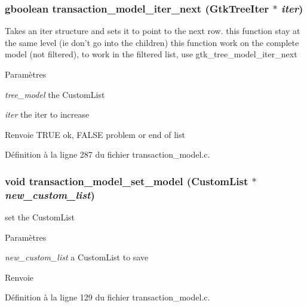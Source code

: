 \subsubsection[{transaction\_\-model\_\-iter\_\-next}]{\setlength{\rightskip}{0pt plus 5cm}gboolean transaction\_\-model\_\-iter\_\-next (GtkTreeIter $\ast$ {\em iter})}\label{transaction__model_8c_a2fd3b631729b3a7c5fd463d06f511b7b}
Takes an iter structure and sets it to point to the next row. this function stay at the same level (ie don't go into the children) this function work on the complete model (not filtered), to work in the filtered list, use gtk\_\-tree\_\-model\_\-iter\_\-next


\begin{DoxyParams}{Paramètres}
\item[{\em tree\_\-model}]the CustomList \item[{\em iter}]the iter to increase\end{DoxyParams}
\begin{DoxyReturn}{Renvoie}
TRUE ok, FALSE problem or end of list 
\end{DoxyReturn}


Définition à la ligne 287 du fichier transaction\_\-model.c.

\subsubsection[{transaction\_\-model\_\-set\_\-model}]{\setlength{\rightskip}{0pt plus 5cm}void transaction\_\-model\_\-set\_\-model ({\bf CustomList} $\ast$ {\em new\_\-custom\_\-list})}\label{transaction__model_8c_abdb06cefc313c26f54d556ad09f71302}
set the CustomList


\begin{DoxyParams}{Paramètres}
\item[{\em new\_\-custom\_\-list}]a CustomList to save\end{DoxyParams}
\begin{DoxyReturn}{Renvoie}

\end{DoxyReturn}


Définition à la ligne 129 du fichier transaction\_\-model.c.

